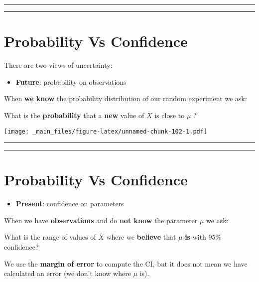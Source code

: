 \documentclass[
]{book}
\providecommand{\tightlist}{%
  \setlength{\itemsep}{0pt}\setlength{\parskip}{0pt}}
\begin{document}
\begin{center}\rule{0.5\linewidth}{0.5pt}\end{center}

\begin{center}\rule{0.5\linewidth}{0.5pt}\end{center}

\hypertarget{probability-vs-confidence}{%
\section{Probability Vs Confidence}\label{probability-vs-confidence}}

There are two views of uncertainty:

\begin{itemize}
\tightlist
\item
  \textbf{Future}: probability on observations
\end{itemize}

When \textbf{we know} the probability distribution of our random experiment we ask:

What is the \textbf{probability} that a \textbf{new} value of \(\bar{X}\) is close to \(\mu\) ?

\texttt{[image: \_main\_files/figure-latex/unnamed-chunk-102-1.pdf]}

\begin{center}\rule{0.5\linewidth}{0.5pt}\end{center}

\begin{center}\rule{0.5\linewidth}{0.5pt}\end{center}

\hypertarget{probability-vs-confidence-1}{%
\section{Probability Vs Confidence}\label{probability-vs-confidence-1}}

\begin{itemize}
\tightlist
\item
  \textbf{Present}: confidence on parameters
\end{itemize}

When we have \textbf{observations} and do \textbf{not know} the parameter \(\mu\) we ask:

What is the range of values of \(\bar{X}\) where we \textbf{believe} that \(\mu\) \textbf{is} with \(95\%\) confidence?

We use the \textbf{margin of error} to compute the CI, but it does not mean we have calculated an error (we don't know where \(\mu\) is).
\end{document}
